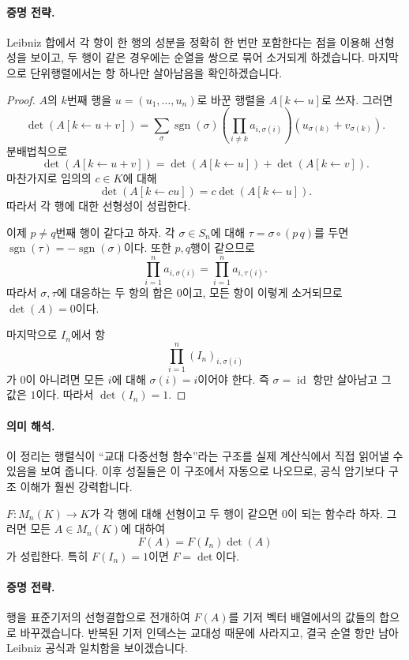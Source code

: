 \paragraph{증명 전략.}
Leibniz 합에서 각 항이 한 행의 성분을 정확히 한 번만 포함한다는 점을 이용해 선형성을 보이고, 두 행이 같은 경우에는 순열을 쌍으로 묶어 소거되게 하겠습니다. 마지막으로 단위행렬에서는 항 하나만 살아남음을 확인하겠습니다.

\begin{proof}
$A$의 $k$번째 행을 $u=(u_1,\dots,u_n)$로 바꾼 행렬을 $A[k\leftarrow u]$로 쓰자. 그러면
$$
\det(A[k\leftarrow u+v])
=\sum_{\sigma}\operatorname{sgn}(\sigma)\left(\prod_{i\ne k}a_{i,\sigma(i)}\right)(u_{\sigma(k)}+v_{\sigma(k)}).
$$
분배법칙으로
$$
\det(A[k\leftarrow u+v])=\det(A[k\leftarrow u])+\det(A[k\leftarrow v]).
$$
마찬가지로 임의의 $c\in K$에 대해
$$
\det(A[k\leftarrow cu])=c\det(A[k\leftarrow u]).
$$
따라서 각 행에 대한 선형성이 성립한다.

이제 $p\ne q$번째 행이 같다고 하자. 각 $\sigma\in S_n$에 대해 $\tau=\sigma\circ(p\,q)$를 두면 $\operatorname{sgn}(\tau)=-\operatorname{sgn}(\sigma)$이다. 또한 $p,q$행이 같으므로
$$
\prod_{i=1}^n a_{i,\sigma(i)}=\prod_{i=1}^n a_{i,\tau(i)}.
$$
따라서 $\sigma,\tau$에 대응하는 두 항의 합은 $0$이고, 모든 항이 이렇게 소거되므로 $\det(A)=0$이다.

마지막으로 $I_n$에서 항
$$
\prod_{i=1}^n (I_n)_{i,\sigma(i)}
$$
가 $0$이 아니려면 모든 $i$에 대해 $\sigma(i)=i$이어야 한다. 즉 $\sigma=\operatorname{id}$ 항만 살아남고 그 값은 $1$이다. 따라서 $\det(I_n)=1$.
\end{proof}

\paragraph{의미 해석.}
이 정리는 행렬식이 ``교대 다중선형 함수''라는 구조를 실제 계산식에서 직접 읽어낼 수 있음을 보여 줍니다. 이후 성질들은 이 구조에서 자동으로 나오므로, 공식 암기보다 구조 이해가 훨씬 강력합니다.

\begin{theorem}
$F:M_n(K)\to K$가 각 행에 대해 선형이고 두 행이 같으면 $0$이 되는 함수라 하자. 그러면 모든 $A\in M_n(K)$에 대하여
$$
F(A)=F(I_n)\det(A)
$$
가 성립한다. 특히 $F(I_n)=1$이면 $F=\det$이다.
\end{theorem}

\paragraph{증명 전략.}
행을 표준기저의 선형결합으로 전개하여 $F(A)$를 기저 벡터 배열에서의 값들의 합으로 바꾸겠습니다. 반복된 기저 인덱스는 교대성 때문에 사라지고, 결국 순열 항만 남아 Leibniz 공식과 일치함을 보이겠습니다.

